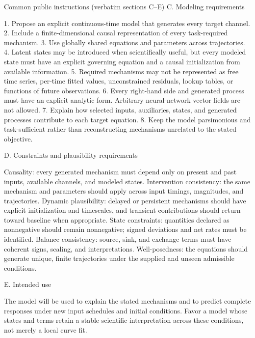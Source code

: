 \begin{afpromptbox}{Common public instructions (verbatim sections C--E)}
C. Modeling requirements

1. Propose an explicit continuous-time model that generates every target
channel.
2. Include a finite-dimensional causal representation of every task-required
mechanism.
3. Use globally shared equations and parameters across trajectories.
4. Latent states may be introduced when scientifically useful, but every
modeled state must have an explicit governing equation and a causal
initialization from available information.
5. Required mechanisms may not be represented as free time series, per-time
fitted values, unconstrained residuals, lookup tables, or functions of
future observations.
6. Every right-hand side and generated process must have an explicit
analytic form. Arbitrary neural-network vector fields are not allowed.
7. Explain how selected inputs, auxiliaries, states, and generated processes
contribute to each target equation.
8. Keep the model parsimonious and task-sufficient rather than
reconstructing mechanisms unrelated to the stated objective.

D. Constraints and plausibility requirements

Causality: every generated mechanism must depend only on present and past
inputs, available channels, and modeled states. Intervention consistency:
the same mechanism and parameters should apply across input timings,
magnitudes, and trajectories. Dynamic plausibility: delayed or persistent
mechanisms should have explicit initialization and timescales, and transient
contributions should return toward baseline when appropriate. State
constraints: quantities declared as nonnegative should remain nonnegative;
signed deviations and net rates must be identified. Balance consistency:
source, sink, and exchange terms must have coherent signs, scaling, and
interpretations. Well-posedness: the equations should generate unique,
finite trajectories under the supplied and unseen admissible conditions.

E. Intended use

The model will be used to explain the stated mechanisms and to predict
complete responses under new input schedules and initial conditions. Favor a
model whose states and terms retain a stable scientific interpretation
across these conditions, not merely a local curve fit.
\end{afpromptbox}

